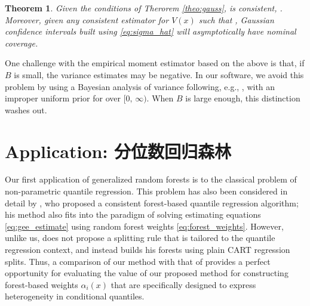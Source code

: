 \documentclass[aos]{imsart}
\theoremstyle{plain}
\newtheorem{theo}[prop]{Theorem}
\theoremstyle{definition}
\theoremstyle{remark}
\begin{document}
\begin{CJK}{UTF8}{gbsn}
\begin{theo}
\label{theo:blb}
Given the conditions of Therorem \ref{theo:gauss},  is consistent,
.
Moreover, given any consistent  estimator for $V(x)$ such that
, Gaussian confidence intervals
built using \eqref{eq:sigma_hat} will asymptotically have nominal coverage.
\end{theo}

One challenge with the empirical moment estimator
based on the above is that, if $B$ is small, the variance estimates
 may be negative. In our software, we avoid this problem
by using a Bayesian analysis of variance following, e.g., \citet{gelman2014bayesian},
with an improper uniform prior for  over $[0, \, \infty)$.
When $B$ is large enough, this distinction washes out.



\newpage

\section{Application: 分位数回归森林}
\label{sec:quantile}

Our first application of generalized random forests is to the classical problem of non-parametric quantile regression.
This problem has also been considered in detail by
\citet{meinshausen2006quantile}, who proposed a consistent forest-based quantile regression
algorithm; his method also fits into the paradigm of solving estimating equations \eqref{eq:gee_estimate}
using random forest weights \eqref{eq:forest_weights}. However, unlike us, \citet{meinshausen2006quantile}
does not propose a splitting rule that is tailored to the quantile regression context, and instead
builds his forests using plain CART regression splits. Thus, a comparison of our method with that of
\citet{meinshausen2006quantile} provides a perfect opportunity for evaluating the value of our
proposed method for constructing forest-based weights $\alpha_i(x)$ that are specifically designed
to express heterogeneity in conditional quantiles.


\end{CJK}
\end{document}
